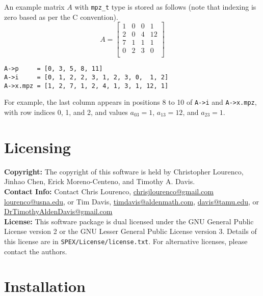\documentclass[12pt]{report}
\theoremstyle{definition}
\begin{document}
An example matrix $A$ with \verb|mpz_t| type is stored as follows (note that indexing is zero based as per the C convention).
\[
A = \begin{bmatrix}
1 & 0 & 0 & 1 \\
2 & 0 & 4 & 12 \\
7 & 1 & 1 & 1 \\
0 & 2 & 3 & 0 \\
\end{bmatrix}
\]

\begin{verbatim}
A->p     = [0, 3, 5, 8, 11]
A->i     = [0, 1, 2, 2, 3, 1, 2, 3, 0,  1, 2]
A->x.mpz = [1, 2, 7, 1, 2, 4, 1, 3, 1, 12, 1]
\end{verbatim}

For example, the last column appears in positions 8 to 10 of \verb|A->i| and \verb|A->x.mpz|, with row indices 0, 1, and 2, and values $a_{03}=1$, $a_{13}=12$, and $a_{23}=1$.


\section{Licensing} \label{s:util:licensing}

\textbf{Copyright:} The copyright of this software is held by Christopher Lourenco, Jinhao Chen, Erick Moreno-Centeno, and Timothy A. Davis.\\

\noindent \textbf{Contact Info:} Contact Chris Lourenco,
\href{mailto:chrisjlourenco@gmail.com}{chrisjlourenco@gmail.com} \href{mailto:lourenco@usna.edu}{lourenco@usna.edu}, or Tim Davis,
\href{mailto:timdavis@aldenmath.com}{timdavis@aldenmath.com},
\href{mailto:davis@tamu.edu}{davis@tamu.edu}, or
\href{DrTimothyAldenDavis@gmail.com}{DrTimothyAldenDavis@gmail.com}\\

\noindent \textbf{License:} This software package is dual licensed under the GNU General Public License version 2 or the GNU Lesser General Public License version 3. Details of this license are in \verb|SPEX/License/license.txt|. For alternative licenses, please contact the authors.


\section{Installation} \label{s:util:install}
\end{document}
